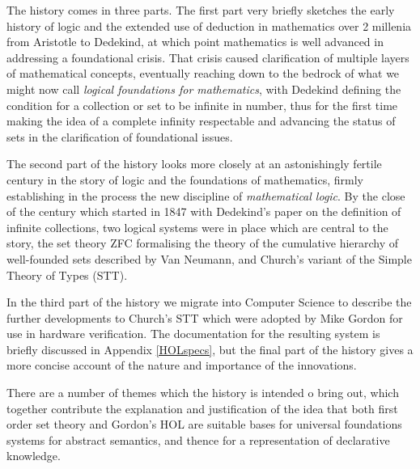 The history comes in three parts.
The first part very briefly sketches the early history of logic and the extended use of deduction in mathematics over 2 millenia from Aristotle to Dedekind, at which point mathematics is well advanced in addressing a foundational crisis.
That crisis caused clarification of multiple layers of mathematical concepts, eventually reaching down to the bedrock of what we might now call \emph{logical foundations for mathematics}, with Dedekind defining the condition for a collection or set to be infinite in number\cite{dedekind1847}, thus for the first time making the idea of a complete infinity respectable and advancing the status of sets in the clarification of foundational issues.

The second part of the history looks more closely at an astonishingly fertile century in the story of logic and the foundations of mathematics, firmly establishing in the process the new discipline of \emph{mathematical logic}.
By the close of the century which started in 1847 with Dedekind's paper on the definition of infinite collections, two logical systems were in place which are central to the story, the set theory ZFC formalising the theory of the cumulative hierarchy of well-founded sets described by Van Neumann\cite{neumann1930}, and Church's variant of the Simple Theory of Types (STT)\cite{church1930}.


In the third part of the history we migrate into Computer Science to describe the further developments to Church's STT which were adopted by Mike Gordon for use in hardware verification.
The documentation for the resulting system is briefly discussed in Appendix \ref{HOLspecs}, but the final part of the history gives a more concise account of the nature and importance of the innovations.

There are a number of themes which the history is intended o bring out, which together contribute the explanation and justification of the idea that both first order set theory and Gordon's HOL are suitable bases for universal foundations systems for abstract semantics, and thence for a representation of declarative knowledge.

